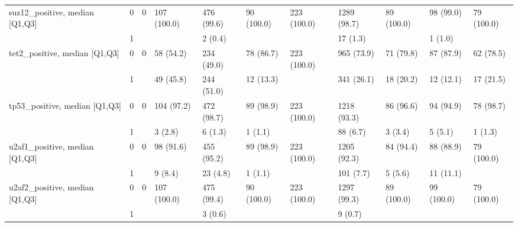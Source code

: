 \begin{tabular}{lllllllllll}
suz12\_positive, median [Q1,Q3] & 0 &                    0 &         107 (100.0) &         476 (99.6) &           90 (100.0) &         223 (100.0) &       1289 (98.7) &        89 (100.0) &           98 (99.0) &           79 (100.0) \\
                 & 1 &                      &                     &            2 (0.4) &                      &                     &          17 (1.3) &                   &             1 (1.0) &                      \\
tet2\_positive, median [Q1,Q3] & 0 &                    0 &           58 (54.2) &         234 (49.0) &            78 (86.7) &         223 (100.0) &        965 (73.9) &         71 (79.8) &           87 (87.9) &            62 (78.5) \\
                 & 1 &                      &           49 (45.8) &         244 (51.0) &            12 (13.3) &                     &        341 (26.1) &         18 (20.2) &           12 (12.1) &            17 (21.5) \\
tp53\_positive, median [Q1,Q3] & 0 &                    0 &          104 (97.2) &         472 (98.7) &            89 (98.9) &         223 (100.0) &       1218 (93.3) &         86 (96.6) &           94 (94.9) &            78 (98.7) \\
                 & 1 &                      &             3 (2.8) &            6 (1.3) &              1 (1.1) &                     &          88 (6.7) &           3 (3.4) &             5 (5.1) &              1 (1.3) \\
u2af1\_positive, median [Q1,Q3] & 0 &                    0 &           98 (91.6) &         455 (95.2) &            89 (98.9) &         223 (100.0) &       1205 (92.3) &         84 (94.4) &           88 (88.9) &           79 (100.0) \\
                 & 1 &                      &             9 (8.4) &           23 (4.8) &              1 (1.1) &                     &         101 (7.7) &           5 (5.6) &           11 (11.1) &                      \\
u2af2\_positive, median [Q1,Q3] & 0 &                    0 &         107 (100.0) &         475 (99.4) &           90 (100.0) &         223 (100.0) &       1297 (99.3) &        89 (100.0) &          99 (100.0) &           79 (100.0) \\
                 & 1 &                      &                     &            3 (0.6) &                      &                     &           9 (0.7) &                   &                     &                      \\

\end{tabular}
